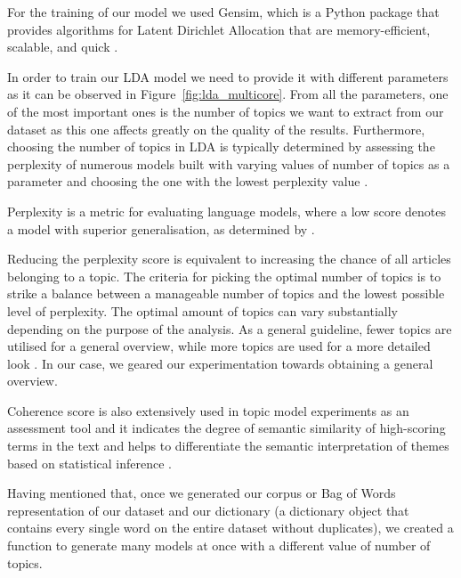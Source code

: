 \documentclass[twoside,12pt,a4paper]{article}
\begin{document}
For the training of our model we used Gensim, which is a Python package that provides algorithms for Latent Dirichlet Allocation that are memory-efficient, scalable, and quick \citep{rehurek_gensimstatistical_nodate, Rehurek10softwareframework}.

In order to train our LDA model we need to provide it with different parameters as it can be observed in Figure~\ref{fig:lda_multicore}. From all the parameters, one of the most important ones is the number of topics we want to extract from our dataset as this one affects greatly on the quality of the results. Furthermore, choosing the number of topics in LDA is typically determined by assessing the perplexity of numerous models built with varying values of number of topics as a parameter and choosing the one with the lowest perplexity value \citep{blei_probabilistic_2010}.

Perplexity is a metric for evaluating language models, where a low score denotes a model with superior generalisation, as determined by \citep{asmussen_smart_2019, xu_probabilistic_2016, blei_correlated_2007, zhao_heuristic_2015}. 

Reducing the perplexity score is equivalent to increasing the chance of all articles belonging to a topic. The criteria for picking the optimal number of topics is to strike a balance between a manageable number of topics and the lowest possible level of perplexity. The optimal amount of topics can vary substantially depending on the purpose of the analysis. As a general guideline, fewer topics are utilised for a general overview, while more topics are used for a more detailed look \citep{asmussen_smart_2019}. In our case, we geared our experimentation towards obtaining a general overview.

Coherence score is also extensively used in topic model experiments as an assessment tool \citep{li_seeded-btm_2019, ferner_automated_2020, albalawi_using_2020, towne_measuring_2016} and it indicates the degree of semantic similarity of high-scoring terms in the text and helps to differentiate the semantic interpretation of themes based on statistical inference \citep{ray_review_2019}.  

Having mentioned that, once we generated our corpus or Bag of Words representation of our dataset and our dictionary (a dictionary object that contains every single word on the entire dataset without duplicates), we created a function to generate many models at once with a different value of number of topics.
\end{document}
